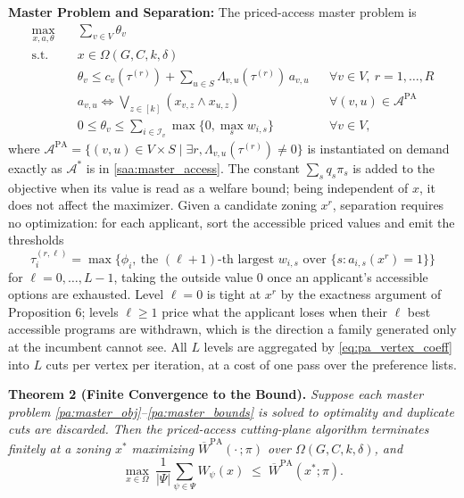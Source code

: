 \documentclass{article}
\begin{document}
\noindent\textbf{Master Problem and Separation:}
The priced-access master problem is
\begin{align}
\max_{x, a, \theta} \quad & \sum_{v \in V} \theta_v \label{pa:master_obj} \\
\textrm{s.t.} \quad & x \in \Omega(G, C, k, \delta) \label{pa:master_omega} \\
& \theta_v \leq c_v(\tau^{(r)}) + \sum_{u \in S} \Lambda_{v, u}(\tau^{(r)})\, a_{v, u} && \forall v \in V, \ r = 1, \dots, R \label{pa:master_cut} \\
& a_{v, u} \iff \bigvee_{z \in [k]} (x_{v, z} \land x_{u, z}) && \forall (v, u) \in \mathcal{A}^{\mathrm{PA}} \label{pa:master_access} \\
& 0 \leq \theta_v \leq \textstyle\sum_{i \in \mathcal{I}_v} \max\{0, \max_s w_{i,s}\} && \forall v \in V, \label{pa:master_bounds}
\end{align}
where $\mathcal{A}^{\mathrm{PA}} = \{(v, u) \in V \times S \mid \exists r, \Lambda_{v, u}(\tau^{(r)}) \neq 0\}$ is instantiated on demand exactly as $\mathcal{A}^*$ is in \eqref{saa:master_access}. The constant $\sum_s q_s \pi_s$ is added to the objective when its value is read as a welfare bound; being independent of $x$, it does not affect the maximizer. Given a candidate zoning $x^r$, separation requires no optimization: for each applicant, sort the accessible priced values and emit the thresholds
\begin{equation}\label{eq:pa_levels}
\tau_i^{(r, \ell)} = \max\Big\{\phi_i, \ \text{the } (\ell+1)\text{-th largest } w_{i,s} \text{ over } \{s : a_{i,s}(x^r) = 1\}\Big\}
\end{equation}
for $\ell = 0, \dots, L-1$, taking the outside value $0$ once an applicant's accessible options are exhausted. Level $\ell = 0$ is tight at $x^r$ by the exactness argument of Proposition 6; levels $\ell \geq 1$ price what the applicant loses when their $\ell$ best accessible programs are withdrawn, which is the direction a family generated only at the incumbent cannot see. All $L$ levels are aggregated by \eqref{eq:pa_vertex_coeff} into $L$ cuts per vertex per iteration, at a cost of one pass over the preference lists.

\noindent\textbf{Theorem 2 (Finite Convergence to the Bound).} \textit{Suppose each master problem \eqref{pa:master_obj}--\eqref{pa:master_bounds} is solved to optimality and duplicate cuts are discarded. Then the priced-access cutting-plane algorithm terminates finitely at a zoning $x^\ast$ maximizing $\overline{W}^{\mathrm{PA}}(\cdot\,; \pi)$ over $\Omega(G, C, k, \delta)$, and}
\begin{equation}\label{eq:pa_certificate}
\max_{x \in \Omega} \ \frac{1}{|\Psi|} \sum_{\psi \in \Psi} W_\psi(x) \;\leq\; \overline{W}^{\mathrm{PA}}(x^\ast; \pi).
\end{equation}
\end{document}
